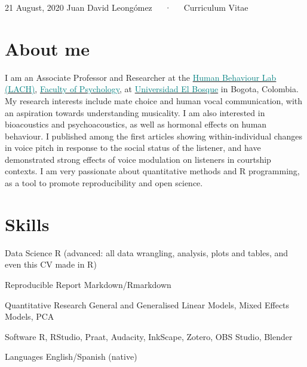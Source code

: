 \documentclass[11pt, a4paper]{awesome-cv}
\begin{document}
\makecvheader

\makecvfooter
  {21 August, 2020}
    {Juan David Leongómez~~~·~~~Curriculum Vitae}
  {\thepage}





\hypertarget{about-me}{%
\section{About me}\label{about-me}}

I am an Associate Professor and Researcher at the \href{https://sites.google.com/unbosque.edu.co/lach-es}{\textcolor{teal}{Human Behaviour Lab (LACH)}}, \href{https://www.uelbosque.edu.co/psicologia}{\textcolor{teal}{Faculty of Psychology}}, at \href{https://www.uelbosque.edu.co/}{\textcolor{teal}{Universidad El Bosque}} in Bogota, Colombia. My research interests include mate choice and human vocal communication, with an aspiration towards understanding musicality. I am also interested in bioacoustics and psychoacoustics, as well as hormonal effects on human behaviour. I published among the first articles showing within-individual changes in voice pitch in response to the social status of the listener, and have demonstrated strong effects of voice modulation on listeners in courtship contexts. I am very passionate about quantitative methods and R programming, as a tool to promote reproducibility and open science.

\hypertarget{skills}{%
\section{Skills}\label{skills}}

\begin{cvskills}
  \cvskill
    {Data Science}
    {R (advanced: all data wrangling, analysis, plots and tables, and even this CV made in R)}

  \cvskill
    {Reproducible Report}
    {Markdown/Rmarkdown}

  \cvskill
    {Quantitative Research}
    {General and Generalised Linear Models, Mixed Effects Models, PCA}

  \cvskill
    {Software}
    {R, RStudio, Praat, Audacity, InkScape, Zotero, OBS Studio, Blender}

  \cvskill
    {Languages}
    {English/Spanish (native)}
\end{cvskills}
\end{document}
